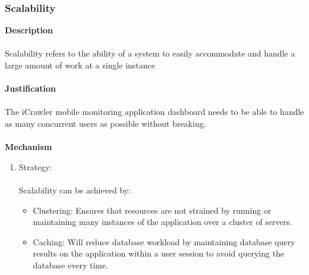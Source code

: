 			\subsubsection*{Scalability}
			\textbf{Description} \\\\
			Scalability refers to the ability of a system to easily accommodate and handle a large amount of work at a single instance \\\\
			\textbf{Justification}\\\\
			The iCrawler mobile monitoring application dashboard needs to be able to handle as many concurrent users as possible without breaking.\\\\
			\textbf{Mechanism}
				\begin{enumerate}
					\item Strategy: \\\\
						Scalability can be achieved by:
						\begin{itemize}
							\item Clustering: Ensures that resources are not strained by running or maintaining many instances of the application over a cluster of servers.  
							\item Caching: Will reduce database workload by maintaining database query results on the application within a user session to avoid querying the database every time. 
						\end{itemize}
				\end{enumerate}	
			\newpage
